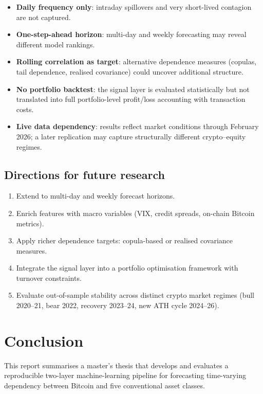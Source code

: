 \documentclass[12pt, a4paper]{article}
\begin{document}
\begin{itemize}
  \item \textbf{Daily frequency only}: intraday spillovers
    and very short-lived contagion are not captured.
  \item \textbf{One-step-ahead horizon}: multi-day and weekly
    forecasting may reveal different model rankings.
  \item \textbf{Rolling correlation as target}: alternative
    dependence measures (copulas, tail dependence, realised
    covariance) could uncover additional structure.
  \item \textbf{No portfolio backtest}: the signal layer is
    evaluated statistically but not translated into full
    portfolio-level profit/loss accounting with transaction costs.
  \item \textbf{Live data dependency}: results reflect
    market conditions through February 2026; a later
    replication may capture structurally different
    crypto–equity regimes.
\end{itemize}

\subsection{Directions for future research}

\begin{enumerate}[noitemsep]
  \item Extend to multi-day and weekly forecast horizons.
  \item Enrich features with macro variables (VIX, credit spreads,
    on-chain Bitcoin metrics).
  \item Apply richer dependence targets: copula-based
    or realised covariance measures.
  \item Integrate the signal layer into a portfolio
    optimisation framework with turnover constraints.
  \item Evaluate out-of-sample stability across distinct
    crypto market regimes (bull 2020–21, bear 2022,
    recovery 2023–24, new ATH cycle 2024–26).
\end{enumerate}

\section{Conclusion}

This report summarises a master's thesis that develops and
evaluates a reproducible two-layer machine-learning pipeline
for forecasting time-varying dependency between Bitcoin
and five conventional asset classes.
\end{document}
